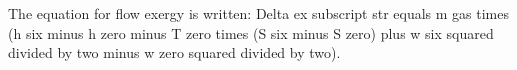 The equation for flow exergy is written:  
Delta ex subscript str equals m gas times (h six minus h zero minus T zero times (S six minus S zero) plus w six squared divided by two minus w zero squared divided by two).